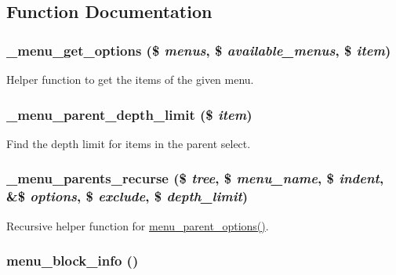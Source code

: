 \subsection{Function Documentation}
\hypertarget{menu_8module_ad73c168be42a7567af9d813c21162c20}{
\subsubsection[{\_\-menu\_\-get\_\-options}]{\setlength{\rightskip}{0pt plus 5cm}\_\-menu\_\-get\_\-options (\$ {\em menus}, \/  \$ {\em available\_\-menus}, \/  \$ {\em item})}}
\label{menu_8module_ad73c168be42a7567af9d813c21162c20}
Helper function to get the items of the given menu. \hypertarget{menu_8module_ad1060ea589cdf66e750f4d82ec37cf6b}{
\subsubsection[{\_\-menu\_\-parent\_\-depth\_\-limit}]{\setlength{\rightskip}{0pt plus 5cm}\_\-menu\_\-parent\_\-depth\_\-limit (\$ {\em item})}}
\label{menu_8module_ad1060ea589cdf66e750f4d82ec37cf6b}
Find the depth limit for items in the parent select. \hypertarget{menu_8module_a2152becd93e11121f34a0457a894d324}{
\subsubsection[{\_\-menu\_\-parents\_\-recurse}]{\setlength{\rightskip}{0pt plus 5cm}\_\-menu\_\-parents\_\-recurse (\$ {\em tree}, \/  \$ {\em menu\_\-name}, \/  \$ {\em indent}, \/  \&\$ {\em options}, \/  \$ {\em exclude}, \/  \$ {\em depth\_\-limit})}}
\label{menu_8module_a2152becd93e11121f34a0457a894d324}
Recursive helper function for \hyperlink{menu_8module_aa1901dfb8654ccbacd62480ccb8c8f9e}{menu\_\-parent\_\-options()}. \hypertarget{menu_8module_a214dafc0a386328b0819ac9c05852f4b}{
\subsubsection[{menu\_\-block\_\-info}]{\setlength{\rightskip}{0pt plus 5cm}menu\_\-block\_\-info ()}}
